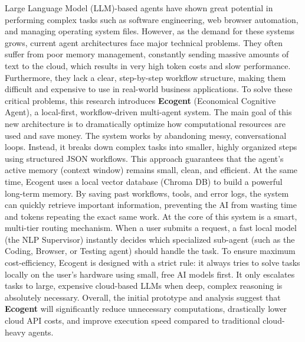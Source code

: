 Large Language Model (LLM)-based agents have shown great potential in performing complex tasks such as software engineering, web browser automation, and managing operating system files. However, as the demand for these systems grows, current agent architectures face major technical problems. They often suffer from poor memory management, constantly sending massive amounts of text to the cloud, which results in very high token costs and slow performance. Furthermore, they lack a clear, step-by-step workflow structure, making them difficult and expensive to use in real-world business applications. To solve these critical problems, this research introduces \textbf{Ecogent} (Economical Cognitive Agent), a local-first, workflow-driven multi-agent system. The main goal of this new architecture is to dramatically optimize how computational resources are used and save money. The system works by abandoning messy, conversational loops. Instead, it breaks down complex tasks into smaller, highly organized steps using structured JSON workflows. This approach guarantees that the agent's active memory (context window) remains small, clean, and efficient. At the same time, Ecogent uses a local vector database (Chroma DB) to build a powerful long-term memory. By saving past workflows, tools, and error logs, the system can quickly retrieve important information, preventing the AI from wasting time and tokens repeating the exact same work. At the core of this system is a smart, multi-tier routing mechanism. When a user submits a request, a fast local model (the NLP Supervisor) instantly decides which specialized sub-agent (such as the Coding, Browser, or Testing agent) should handle the task. To ensure maximum cost-efficiency, Ecogent is designed with a strict rule: it always tries to solve tasks locally on the user's hardware using small, free AI models first. It only escalates tasks to large, expensive cloud-based LLMs when deep, complex reasoning is absolutely necessary. Overall, the initial prototype and analysis suggest that \textbf{Ecogent} will significantly reduce unnecessary computations, drastically lower cloud API costs, and improve execution speed compared to traditional cloud-heavy agents.